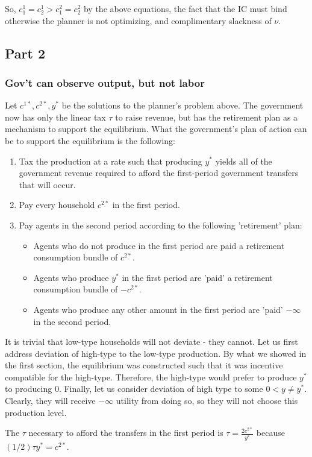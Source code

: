 \documentclass[11pt]{article} %
\begin{document}
So, $c_1^1 = c_2^1 > c_1^2 = c_2^2$ by the above equations, the fact that the IC must bind otherwise the planner is not optimizing, and complimentary slackness of $\nu$.
\subsection{Part 2}
\subsubsection{Gov't can observe output, but not labor}
Let $c^{1*},c^{2*},y^{*}$ be the solutions to the planner's problem above. The government now has only the linear tax $\tau$ to raise revenue, but has the retirement plan as a mechanism to support the equilibrium. What the government's plan of action can be to support the equilibrium is the following:
\begin{enumerate}
\item Tax the production at a rate such that producing $y^*$ yields all of the government revenue required to afford the first-period government transfers that will occur.
\item Pay every household $c^{2*}$ in the first period.
\item Pay agents in the second period according to the following 'retirement' plan:
\begin{itemize}
\item Agents who do not produce in the first period are paid a retirement consumption bundle of $c^{2*}$.
\item Agents who produce $y^*$ in the first period are 'paid' a retirement consumption bundle of $-c^{2*}$.
\item Agents who produce any other amount in the first period are 'paid' $-\infty$ in the second period.
\end{itemize}
\end{enumerate}

It is trivial that low-type households will not deviate - they cannot. Let us first address deviation of high-type to the low-type production. By what we showed in the  first section, the equilibrium was constructed such that it was incentive compatible for the high-type. Therefore, the high-type would prefer to produce $y^{*}$ to producing $0$. Finally, let us consider deviation of high type to some $0<y\neq y^{*}$. Clearly, they will receive $-\infty$ utility from doing so, so they will not choose this production level.

The $\tau$ necessary to afford the transfers in the first period is $\tau = \frac{2c^{2*}}{y^*}$ because $(1/2)\tau y^{*} = c^{2*} $.
\end{document}
